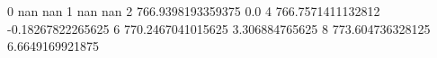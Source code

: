 0 nan nan
1 nan nan
2 766.9398193359375 0.0
4 766.7571411132812 -0.18267822265625
6 770.2467041015625 3.306884765625
8 773.604736328125 6.6649169921875
